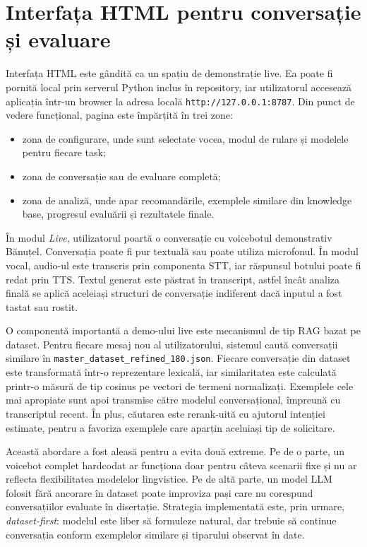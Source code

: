 \section{Interfața HTML pentru conversație și evaluare}
\label{sec:demo-pipeline-html}

Interfața HTML este gândită ca un spațiu de demonstrație live. Ea poate fi pornită local prin serverul Python inclus în repository, iar utilizatorul accesează aplicația într-un browser la adresa locală \texttt{http://127.0.0.1:8787}. Din punct de vedere funcțional, pagina este împărțită în trei zone:

\begin{itemize}
    \item zona de configurare, unde sunt selectate vocea, modul de rulare și modelele pentru fiecare task;
    \item zona de conversație sau de evaluare completă;
    \item zona de analiză, unde apar recomandările, exemplele similare din knowledge base, progresul evaluării și rezultatele finale.
\end{itemize}

În modul \textit{Live}, utilizatorul poartă o conversație cu voicebotul demonstrativ Bănuțel. Conversația poate fi pur textuală sau poate utiliza microfonul. În modul vocal, audio-ul este transcris prin componenta STT, iar răspunsul botului poate fi redat prin TTS. Textul generat este păstrat în transcript, astfel încât analiza finală se aplică aceleiași structuri de conversație indiferent dacă inputul a fost tastat sau rostit.

O componentă importantă a demo-ului live este mecanismul de tip RAG bazat pe dataset. Pentru fiecare mesaj nou al utilizatorului, sistemul caută conversații similare în \texttt{master\_dataset\_refined\_180.json}. Fiecare conversație din dataset este transformată într-o reprezentare lexicală, iar similaritatea este calculată printr-o măsură de tip cosinus pe vectori de termeni normalizați. Exemplele cele mai apropiate sunt apoi transmise către modelul conversațional, împreună cu transcriptul recent. În plus, căutarea este rerank-uită cu ajutorul intenției estimate, pentru a favoriza exemplele care aparțin aceluiași tip de solicitare.

Această abordare a fost aleasă pentru a evita două extreme. Pe de o parte, un voicebot complet hardcodat ar funcționa doar pentru câteva scenarii fixe și nu ar reflecta flexibilitatea modelelor lingvistice. Pe de altă parte, un model LLM folosit fără ancorare în dataset poate improviza pași care nu corespund conversațiilor evaluate în disertație. Strategia implementată este, prin urmare, \textit{dataset-first}: modelul este liber să formuleze natural, dar trebuie să continue conversația conform exemplelor similare și tiparului observat în date.

